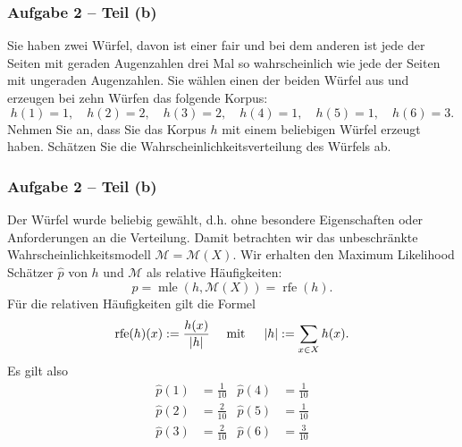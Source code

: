 \documentclass{beamer}
\DeclareMathOperator{\rfe}{rfe}
\begin{document}
\begin{frame} \frametitle{Aufgabe 2 -- Teil (b)}
	\justifying \small
	Sie haben zwei Würfel, davon ist einer fair und bei dem anderen ist jede der Seiten mit geraden Augenzahlen drei Mal so wahrscheinlich wie jede der Seiten mit ungeraden Augenzahlen. Sie wählen einen der beiden Würfel aus und erzeugen bei zehn Würfen das folgende Korpus:
	\begin{equation*}
		h(1) = 1, \quad h(2) = 2, \quad h(3) = 2, \quad h(4) = 1, \quad h(5) = 1, \quad h(6) = 3.
	\end{equation*}
	Nehmen Sie an, dass Sie das Korpus $h$ mit einem beliebigen Würfel erzeugt haben. Schätzen
	Sie die Wahrscheinlichkeitsverteilung des Würfels ab.

\end{frame}

\begin{frame} \frametitle{Aufgabe 2 -- Teil (b)}
	\justifying \footnotesize
	Der Würfel wurde beliebig gewählt, d.h. ohne besondere Eigenschaften oder Anforderungen an die Verteilung. Damit betrachten wir das unbeschränkte Wahrscheinlichkeitsmodell $\mathcal{M} = \mathcal{M}(X)$. Wir erhalten den Maximum Likelihood Schätzer $\hat{p}$ von $h$ und $\mathcal{M}$ als relative Häufigkeiten:
	\begin{equation*}
		\hat{p} = \operatorname{mle}(h, \mathcal{M}(X)) = \operatorname{rfe}(h).
	\end{equation*}
	Für die relativen Häufigkeiten gilt die Formel
	\begin{equation*}
		\rfe(h)(x) \defeq \frac{h(x)}{\abs{h}} \quad \mit \quad \abs{h} \defeq \sum_{x \in X} h(x).
	\end{equation*}
	Es gilt also
	\begin{align*}
		\hat{p}(1) &= \frac{1}{10} & \hat{p}(4) &= \frac{1}{10} \\
		\hat{p}(2) &= \frac{2}{10} & \hat{p}(5) &= \frac{1}{10} \\
		\hat{p}(3) &= \frac{2}{10} & \hat{p}(6) &= \frac{3}{10}
	\end{align*}
\end{frame}
\end{document}
